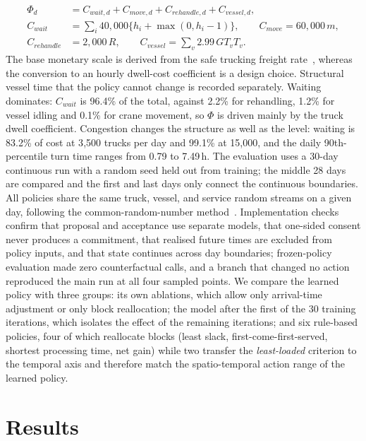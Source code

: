 \documentclass[a4paper]{llncs}
\begin{document}
\begin{equation}
\begin{aligned}
\Phi_d&=C_{wait,d}+C_{move,d}+C_{rehandle,d}+C_{vessel,d},\\
C_{wait}&=\sum_i 40{,}000\{h_i+\max(0,h_i-1)\},\qquad
C_{move}=60{,}000\,m,\\
C_{rehandle}&=2{,}000\,R,\qquad
C_{vessel}=\sum_v 2.99\,GT_v T_v.
\end{aligned}
\end{equation}
The base monetary scale is
derived from the safe trucking freight rate~\cite{ref24}, whereas the
conversion to an hourly dwell-cost coefficient is a design choice.
Structural vessel time that the policy cannot change is recorded
separately. Waiting dominates: $C_{wait}$ is 96.4\% of the total, against 2.2\% for
rehandling, 1.2\% for vessel idling and 0.1\% for crane movement, so
$\Phi$ is driven mainly by the truck dwell coefficient. Congestion
changes the structure as well as the level: waiting is 83.2\% of cost at
3{,}500 trucks per day and 99.1\% at 15{,}000, and the daily
90th-percentile turn time ranges from 0.79 to 7.49\,h.
The evaluation uses a 30-day continuous run with a random seed held
out from training; the middle 28 days are
compared and the first and last days only connect the continuous
boundaries. All policies share the same truck, vessel, and service
random streams on a given day, following the common-random-number
method~\cite{ref22}. Implementation checks confirm that proposal and acceptance use separate
models, that one-sided consent never produces a commitment, that realised
future times are excluded from policy inputs, and that state continues
across day boundaries; frozen-policy evaluation made zero counterfactual calls, and
a branch that changed no action reproduced the main run at all four
sampled points. We compare the learned policy with three groups:
its own ablations, which allow only arrival-time adjustment or only
block reallocation; the model after the first of the 30 training
iterations, which isolates the effect of the remaining iterations; and
six rule-based policies, four of which reallocate blocks
(least slack, first-come-first-served, shortest processing time, net
gain) while two transfer the \emph{least-loaded} criterion to the
temporal axis and therefore match the spatio-temporal action range of
the learned policy.

\section{Results}
\label{sec:exp}
\end{document}
